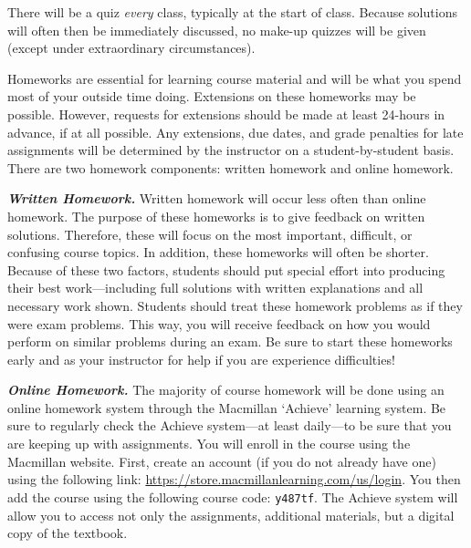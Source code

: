 \documentclass[11pt,letterpaper]{article}
\begin{document}
There will be a quiz \textit{every} class, typically at the start of class. Because solutions will often then be immediately discussed, no make-up quizzes will be given (except under extraordinary circumstances). \pspace


Homeworks are essential for learning course material and will be what you spend most of your outside time doing. Extensions on these homeworks may be possible. However, requests for extensions should be made at least 24-hours in advance, if at all possible. Any extensions, due dates, and grade penalties for late assignments will be determined by the instructor on a student-by-student basis. There are two homework components: written homework and online homework. 



\newpage



{\itshape\bfseries\color{stacred}Written Homework.} Written homework will occur less often than online homework. The purpose of these homeworks is to give feedback on written solutions. Therefore, these will focus on the most important, difficult, or confusing course topics. In addition, these homeworks will often be shorter. Because of these two factors, students should put special effort into producing their best work---including full solutions with written explanations and all necessary work shown. Students should treat these homework problems as if they were exam problems. This way, you will receive feedback on how you would perform on similar problems during an exam. Be sure to start these homeworks early and as your instructor for help if you are experience difficulties! \pspace

{\itshape\bfseries\color{stacred}Online Homework.} The majority of course homework will be done using an online homework system through the Macmillan `Achieve' learning system. Be sure to regularly check the Achieve system---at least daily---to be sure that you are keeping up with assignments. You will enroll in the course using the Macmillan website. First, create an account (if you do not already have one) using the following link: \href{https://store.macmillanlearning.com/us/login}{https://store.macmillanlearning.com/us/login}. You then add the course using the following course code: \texttt{y487tf}. The Achieve system will allow you to access not only the assignments, additional materials, but a digital copy of the textbook. \pspace
\end{document}
